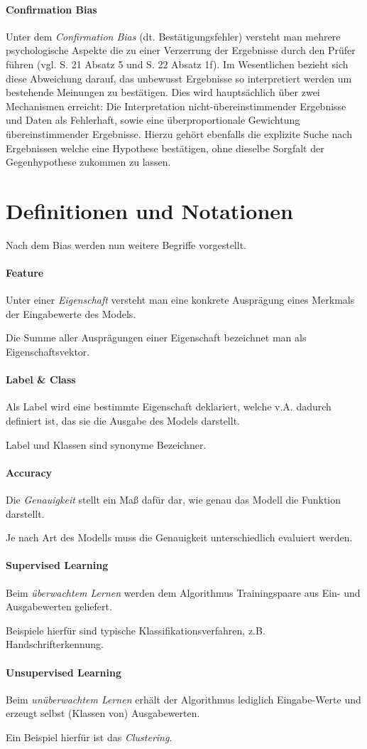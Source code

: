 \paragraph{Confirmation Bias} Unter dem \textit{Confirmation Bias} (dt. Bestätigungsfehler) versteht man mehrere psychologische Aspekte die zu einer Verzerrung der Ergebnisse durch den Prüfer führen (vgl. \cite{ConfirmationBias} S. 21 Absatz 5 und S. 22 Absatz 1f). Im Wesentlichen bezieht sich diese Abweichung darauf, das unbewusst Ergebnisse so interpretiert werden um bestehende Meinungen zu bestätigen. Dies wird hauptsächlich über zwei Mechanismen erreicht: Die Interpretation nicht-übereinstimmender Ergebnisse und Daten als Fehlerhaft, sowie eine überproportionale Gewichtung übereinstimmender Ergebnisse. Hierzu gehört ebenfalls die explizite Suche nach Ergebnissen welche eine Hypothese bestätigen, ohne dieselbe Sorgfalt der Gegenhypothese zukommen zu lassen. 

\section{Definitionen und Notationen}
\label{Sec:Definitionen}\label{Definitionen}\label{Defs}
Nach dem Bias werden nun weitere Begriffe vorgestellt.
\paragraph{Feature} Unter einer \textit{Eigenschaft} versteht man eine konkrete Ausprägung eines Merkmals der Eingabewerte des Models.  

Die Summe aller Ausprägungen einer Eigenschaft bezeichnet man als Eigenschaftsvektor.  
\paragraph{Label \& Class} Als Label wird eine bestimmte Eigenschaft deklariert, welche v.A. dadurch definiert ist, das sie die Ausgabe des Models darstellt. 

Label und Klassen sind synonyme Bezeichner.
\paragraph{Accuracy} Die \textit{Genauigkeit} stellt ein Maß dafür dar, wie genau das Modell die Funktion darstellt. 

Je nach Art des Modells muss die Genauigkeit unterschiedlich evaluiert werden. 
\paragraph{Supervised Learning} Beim \textit{überwachtem Lernen} werden dem Algorithmus Trainingspaare aus Ein- und Ausgabewerten geliefert. 

Beispiele hierfür sind typische Klassifikationsverfahren, z.B. Handschrifterkennung.
\paragraph{Unsupervised Learning} Beim \textit{unüberwachtem Lernen} erhält der Algorithmus lediglich Eingabe-Werte und erzeugt selbst (Klassen von) Ausgabewerten. 

Ein Beispiel hierfür ist das \textit{Clustering}. 